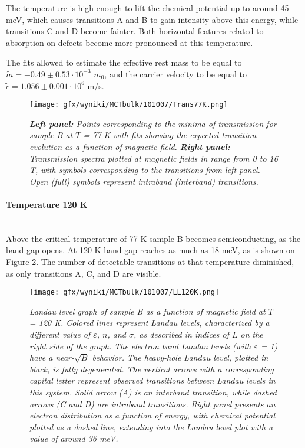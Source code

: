 \documentclass[titlepage,a4paper]{book}
\newcommand{\wciecie}{\quad\phantom{v}}
\newcommand{\myparagraph}[1]{\paragraph{#1}\mbox{}\\}
\begin{document}
The temperature is high enough to lift the chemical potential up to around 45 meV, which causes transitions A and B to gain intensity above this energy, while transitions C and D become fainter. Both horizontal features related to absorption on defects become more pronounced at this temperature.

The fits allowed to estimate the effective rest mass to be equal to $\tilde m = -0.49 \pm 0.53 \cdot 10^{-3}$ $m_0$, and the carrier velocity to be equal to $\tilde{c} = 1.056 \pm 0.001 \cdot 10^6$ m/s.

\begin{figure}[ht]
	\centering
	\texttt{[image: gfx/wyniki/MCTbulk/101007/Trans77K.png]}
	\vspace{-10pt}
	\caption{\textit{\textbf{Left panel:} Points corresponding to the minima of transmission for sample B at $T$ = 77 K with fits showing the expected transition evolution as a function of magnetic field. \textbf{Right panel:} Transmission spectra plotted at magnetic fields in range from 0 to 16 T, with symbols corresponding to the transitions from left panel. Open (full) symbols represent intraband (interband) transitions.}}
	\label{fig:Spectra_101007_77K}
\end{figure}

\clearpage
\myparagraph{Temperature 120 K}
\wciecie
Above the critical temperature of 77 K sample B becomes semiconducting, as the band gap opens. At 120 K band gap reaches as much as 18 meV, as is shown on Figure \ref{fig:LL_101007_120K}. The number of detectable transitions at that temperature diminished, as only transitions A, C, and D are visible.  
\begin{figure}[ht]
	\centering
	\texttt{[image: gfx/wyniki/MCTbulk/101007/LL120K.png]}
	\vspace{-10pt}
	\caption{\textit{Landau level graph of sample B as a function of magnetic field at $T$ = 120 K. Colored lines represent Landau levels, characterized by a different value of $\varepsilon$, $n$, and $\sigma$, as described in indices of $L$ on the right side of the graph. The electron band Landau levels (with $\varepsilon$ = 1) have a near-$\sqrt{B}$ behavior. The heavy-hole Landau level, plotted in black, is fully degenerated. The vertical arrows with a corresponding capital letter represent observed transitions between Landau levels in this system. Solid arrow (A) is an interband transition, while dashed arrows (C and D) are intraband transitions. Right panel presents an electron distribution as a function of energy, with chemical potential plotted as a dashed line, extending into the Landau level plot with a value of around 36 meV.}}
	\label{fig:LL_101007_120K}
\end{figure}
\end{document}
